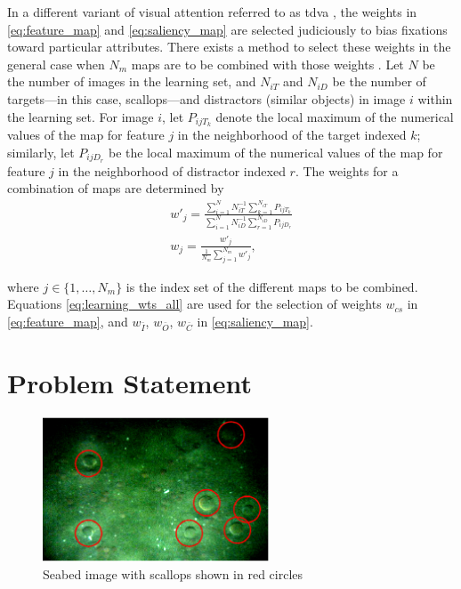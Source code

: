 \documentclass {udthesis}
\begin{document}
In a different variant of visual attention referred to as \gls{tdva} \cite{navalpakkam},
the weights in \eqref{eq:feature_map} and \eqref{eq:saliency_map}
are selected judiciously to bias fixations toward particular attributes. There exists a method to select these weights in the general case when $N_m$ maps are to be combined with those weights \cite{navalpakkam}.
Let $N$ be the number of images in the learning set,
and $N_{iT}$ and $N_{iD}$ be the number of targets---in this case, scallops---and distractors 
(similar objects) in image $i$ within the learning set.
For image $i$, let $P_{ijT_{k}}$ denote the local maximum of the numerical values of the map for feature $j$ in the neighborhood of the target indexed $k$;
similarly, let $P_{ijD_{r}}$ be the local maximum of the numerical values of the map for feature $j$ in the neighborhood of distractor indexed $r$.
The weights for a combination of maps are determined by
\begin{align} \label{eq:learning_wts_all}
w'_{j}=\frac{\sum_{i=1}^{N} N_{iT}^{-1}\sum_{k=1}^{N_{iT}}P_{ijT_{k}} }{
\sum_{i=1}^{N} N_{iD}^{-1} \sum_{r=1}^{N_{iD}}P_{ijD_{r}}} \nonumber \\
w_{j}=\frac{w'_{j}}{\frac{1}{N_m} \sum_{j=1}^{N_{m}}w'_{j} },
\end{align}

where $j\in\{1,\ldots,N_{m}\}$ is the index set of the different maps to be combined. 
Equations \eqref{eq:learning_wts_all} are used for the selection of weights $w_{cs}$ in \eqref{eq:feature_map}, and $w_{\bar{I}}$, $w_{\bar{O}}$, $w_{\bar{C}}$ in 
\eqref{eq:saliency_map}.

\section{Problem Statement}

\begin{figure}
      \centering
      \includegraphics[width=0.6\textwidth]{scallopred}
      \caption[Seabed image with scallops shown in red circles]{Seabed image with scallops shown in red circles}
      \label{fig:scallopred}
\end{figure} 
\end{document}
